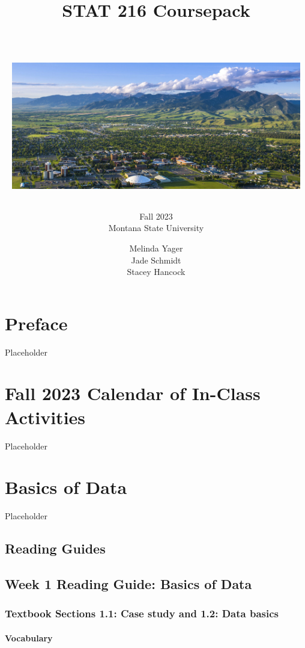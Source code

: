 \documentclass[
]{report}
\title{\textbf{STAT 216 Coursepack}\\
\strut \\
\includegraphics[width=5in,height=\textheight]{images/msu-campus.jpg}}
\subtitle{Fall 2023\\
Montana State University}
\author{Melinda Yager\\
Jade Schmidt\\
Stacey Hancock}
\date{}
\begin{document}
\maketitle

\hypertarget{preface}{%
\chapter*{Preface}\label{preface}}

Placeholder

\hypertarget{fall-2023-calendar-of-in-class-activities}{%
\chapter*{Fall 2023 Calendar of In-Class Activities}\label{fall-2023-calendar-of-in-class-activities}}

Placeholder

\hypertarget{basics-of-data}{%
\chapter{Basics of Data}\label{basics-of-data}}

Placeholder

\hypertarget{reading-guides}{%
\section{Reading Guides}\label{reading-guides}}

\hypertarget{week-1-reading-guide-basics-of-data}{%
\section{Week 1 Reading Guide: Basics of Data}\label{week-1-reading-guide-basics-of-data}}

\hypertarget{textbook-sections-1.1-case-study-and-1.2-data-basics}{%
\subsection*{Textbook Sections 1.1: Case study and 1.2: Data basics}\label{textbook-sections-1.1-case-study-and-1.2-data-basics}}

\hypertarget{vocabulary}{%
\subsubsection*{Vocabulary}\label{vocabulary}}
\end{document}
